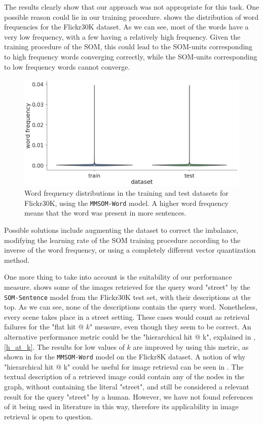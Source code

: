 \documentclass[a4paper]{standalone}
\begin{document}
The results clearly show that our approach was not appropriate for this task. One possible reason could lie in our training procedure.  shows the distribution of word frequencies for the Flickr30K dataset. As we can see, most of the words have a very low frequency, with a few having a relatively high frequency. Given the training procedure of the SOM, this could lead to the SOM-units corresponding to high frequency words converging correctly, while the SOM-units corresponding to low frequency words cannot converge.

\begin{figure}[h]
    \centering
    \includegraphics[width=\textwidth]{images/flickr30k_word_frequency.png}
    \caption{Word frequency distributions in the training and test datasets for Flickr30K, using the \texttt{MMSOM-Word} model. A higher word frequency means that the word was present in more sentences.}
    \label{fig:Flickr30kWordFreq}
\end{figure}

Possible solutions include augmenting the dataset to correct the imbalance, modifying the learning rate of the SOM training procedure according to the inverse of the word frequency, or using a completely different vector quantization method.

One more thing to take into account is the suitability of our performance measure.  shows some of the images retrieved for the query word "street" by the \verb|SOM-Sentence| model from the Flickr30K test set, with their descriptions at the top. As we can see, none of the descriptions contain the query word. Nonetheless, every scene takes place in a street setting. These cases would count as retrieval failures for the "flat hit @ $k$" measure, even though they seem to be correct. An alternative performance metric could be the "hierarchical hit @ k", explained in , \eqref{h_at_k}. The results for low values of $k$ are improved by using this metric, as shown in  for the \verb|MMSOM-Word| model on the Flickr8K dataset. A notion of why "hierarchical hit @ k" could be useful for image retrieval can be seen in . The textual description of a retrieved image could contain any of the nodes in the graph, without containing the literal "street", and still be considered a relevant result for the query "street" by a human.
However, we have not found references of it being used in literature in this way, therefore its applicability in image retrieval is open to question.
\end{document}
